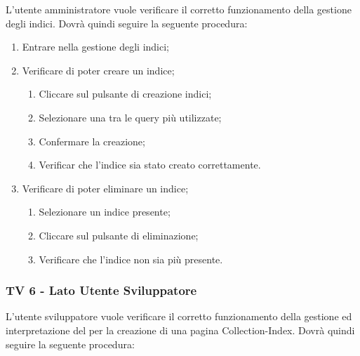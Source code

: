 L’utente amministratore vuole verificare il corretto funzionamento della gestione degli indici.
Dovrà quindi seguire la seguente procedura:

\begin{enumerate}
\item Entrare nella gestione degli indici;
\item Verificare di poter creare un indice;
\begin{enumerate}
\item Cliccare sul pulsante di creazione indici;
\item Selezionare una tra le query più utilizzate;
\item Confermare la creazione;
\item Verificar che l'indice sia stato creato correttamente.
\end{enumerate}
\item Verificare di poter eliminare un indice;
\begin{enumerate}
\item Selezionare un indice presente;
\item Cliccare sul pulsante di eliminazione;
\item Verificare che l'indice non sia più presente.
\end{enumerate}
\end{enumerate}

\subsubsection{TV 6 - Lato Utente Sviluppatore}

L'utente sviluppatore vuole verificare il corretto funzionamento della gestione ed interpretazione del  per la creazione di una pagina Collection-Index.
Dovrà quindi seguire la seguente procedura:

